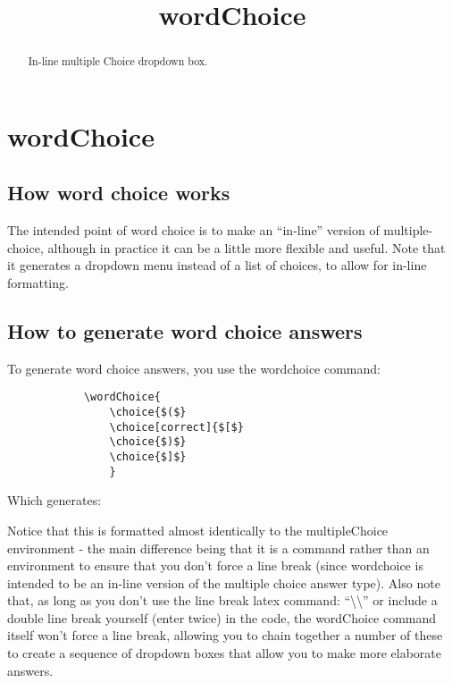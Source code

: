 \documentclass{ximera}
\title{wordChoice}
\begin{document}
\begin{abstract}
    In-line multiple Choice dropdown box.
\end{abstract}
\maketitle
\section*{wordChoice}
    \subsection*{How word choice works}
    
    The intended point of word choice is to make an ``in-line'' version of multiple-choice, although in practice it can be a little more flexible and useful. Note that it generates a dropdown menu instead of a list of choices, to allow for in-line formatting.

    \subsection*{How to generate word choice answers}
        To generate word choice answers, you use the wordchoice command:
        \begin{verbatim} 
            \wordChoice{
                \choice{$($}
                \choice[correct]{$[$}
                \choice{$)$}
                \choice{$]$}
                }
        \end{verbatim}
        
        Which generates: 
        \wordChoice{
            \choice{$($}
            \choice[correct]{$[$}
            \choice{$)$}
            \choice{$]$}
            }
        
        Notice that this is formatted almost identically to the multipleChoice environment - the main difference being that it is a command rather than an environment to ensure that you don't force a line break (since wordchoice is intended to be an in-line version of the multiple choice answer type). Also note that, as long as you don't use the line break latex command: ``\textbackslash\textbackslash{}'' or include a double line break yourself (enter twice) in the code, the wordChoice command itself won't force a line break, allowing you to chain together a number of these to create a sequence of dropdown boxes that allow you to make more elaborate answers. 
        
\end{document}
